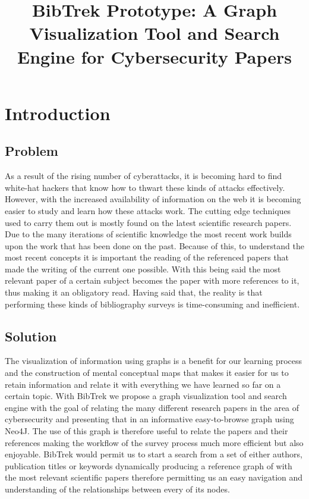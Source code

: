 \documentclass[twocolumn]{article}
\begin{document}
\title{\textbf{BibTrek Prototype: A Graph Visualization Tool and Search Engine for Cybersecurity Papers}}
\date{}
\maketitle

\section{Introduction}
\subsection{Problem}
As a result of the rising number of cyberattacks, it is becoming hard to find white-hat hackers that know how to thwart these kinds of attacks effectively. However, with the increased availability of information on the web it is becoming easier to study and learn how these attacks work. The cutting edge techniques used to carry them out is mostly found on the latest scientific research papers. Due to the many iterations of scientific knowledge the most recent work builds upon the work that has been done on the past. Because of this, to understand the most recent concepts it is important the reading of the referenced papers that made the writing of the current one possible. With this being said the most relevant paper of a certain subject becomes the paper with more references to it, thus making it an obligatory read. Having said that, the reality is that performing these kinds of bibliography surveys is time-consuming and inefficient.

\subsection{Solution}
The visualization of information using graphs is a benefit for our learning process and the construction of mental conceptual maps that makes it easier for us to retain information and relate it with everything we have learned so far on a certain topic.
With BibTrek we propose a graph visualization tool and search engine with the goal of relating the many different research papers in the area of cybersecurity and presenting that in an informative easy-to-browse graph using Neo4J. The use of this graph is therefore useful to relate the papers and their references making the workflow of the survey process much more efficient but also enjoyable. BibTrek would permit us to start a search from a set of either authors, publication titles or keywords dynamically producing a reference graph of with the most relevant scientific papers therefore permitting us an easy navigation and understanding of the relationships between every of its nodes.
\end{document}
